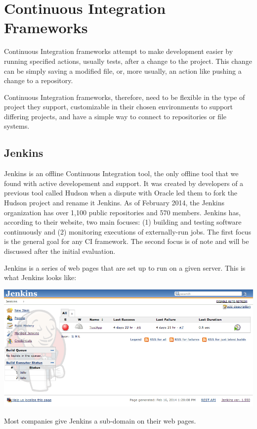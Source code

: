 \documentclass[12pt]{ucthesis}
\newenvironment{Figure}
  {\par\medskip\noindent\minipage{\linewidth}}
  {\endminipage\par\medskip}
\begin{document}
\section{Continuous Integration Frameworks}
Continuous Integration frameworks attempt to make development easier by running specified actions, usually tests, after a change to the project. This change can be simply saving a modified file, or, more usually, an action like pushing a change to a repository.

Continuous Integration frameworks, therefore, need to be flexible in the type of project they support, customizable in their chosen environments to support differing projects, and have a simple way to connect to repositories or file systems.

\subsection{Jenkins}
Jenkins\cite{Jenkins} is an offline Continuous Integration tool, the only offline tool that we found with active developement and support. It was created by developers of a previous tool called Hudson when a dispute with Oracle led them to fork the Hudson project and rename it Jenkins. As of February 2014, the Jenkins organization has over 1,100 public repositories and 570 members\cite{JenkinsGitHub}. Jenkins has, according to their website, two main focuses: (1) building and testing software continuously and (2) monitoring executions of externally-run jobs. The first focus is the general goal for any CI framework. The second focus is of note and will be discussed after the initial evaluation. 

Jenkins is a series of web pages that are set up to run on a given server. This is what Jenkins looks like:
\begin{Figure}
  \centering
  \includegraphics[width=0.95\linewidth]{jenkins.png}

\end{Figure}
Most companies give Jenkins a sub-domain on their web pages.
\end{document}

